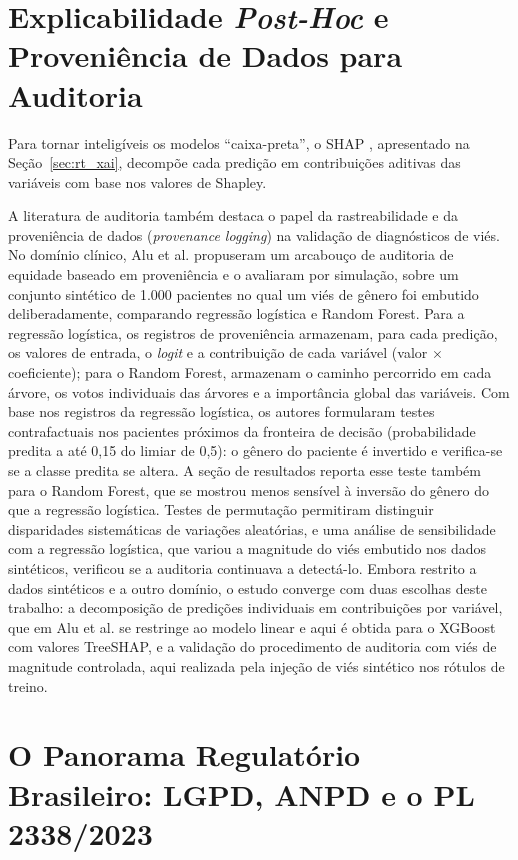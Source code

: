 \section{Explicabilidade \textit{Post-Hoc} e Proveniência de Dados para Auditoria}
\label{sec:explicabilidade_proveniencia}

Para tornar inteligíveis os modelos ``caixa-preta'', o SHAP \cite{lundberg2017unified}, apresentado na Seção~\ref{sec:rt_xai}, decompõe cada predição em contribuições aditivas das variáveis com base nos valores de Shapley.

A literatura de auditoria também destaca o papel da rastreabilidade e da proveniência de dados (\textit{provenance logging}) na validação de diagnósticos de viés. No domínio clínico, Alu et al. \cite{alu2026auditing} propuseram um arcabouço de auditoria de equidade baseado em proveniência e o avaliaram por simulação, sobre um conjunto sintético de 1.000 pacientes no qual um viés de gênero foi embutido deliberadamente, comparando regressão logística e Random Forest. Para a regressão logística, os registros de proveniência armazenam, para cada predição, os valores de entrada, o \textit{logit} e a contribuição de cada variável (valor $\times$ coeficiente); para o Random Forest, armazenam o caminho percorrido em cada árvore, os votos individuais das árvores e a importância global das variáveis. Com base nos registros da regressão logística, os autores formularam testes contrafactuais nos pacientes próximos da fronteira de decisão (probabilidade predita a até 0,15 do limiar de 0,5): o gênero do paciente é invertido e verifica-se se a classe predita se altera. A seção de resultados reporta esse teste também para o Random Forest, que se mostrou menos sensível à inversão do gênero do que a regressão logística. Testes de permutação permitiram distinguir disparidades sistemáticas de variações aleatórias, e uma análise de sensibilidade com a regressão logística, que variou a magnitude do viés embutido nos dados sintéticos, verificou se a auditoria continuava a detectá-lo. Embora restrito a dados sintéticos e a outro domínio, o estudo converge com duas escolhas deste trabalho: a decomposição de predições individuais em contribuições por variável, que em Alu et al. se restringe ao modelo linear e aqui é obtida para o XGBoost com valores TreeSHAP, e a validação do procedimento de auditoria com viés de magnitude controlada, aqui realizada pela injeção de viés sintético nos rótulos de treino.

\section{O Panorama Regulatório Brasileiro: LGPD, ANPD e o PL 2338/2023}
\label{sec:panorama_regulatorio}

